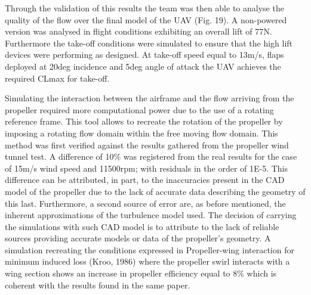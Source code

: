 \documentclass[../../main.tex]{subfiles}
\begin{document}

Through the validation of this results the team was then able to analyse the quality of the flow over the final model of the UAV (Fig. 19).
A non-powered version was analysed in flight conditions exhibiting an overall lift of 77N.
Furthermore the take-off conditions were simulated to ensure that the high lift devices were performing as designed.
At take-off speed equal to 13m/s, flaps deployed at 20deg incidence and 5deg angle of attack the UAV achieves the required CLmax for take-off. 


Simulating the interaction between the airframe and the flow arriving from the propeller required more computational power due to the use of a rotating reference frame.
This tool allows to recreate the rotation of the propeller by imposing a rotating flow domain within the free moving flow domain.
This method was first verified against the results gathered from the propeller wind tunnel test.
A difference of 10\% was registered from the real results for the case of 15m/s wind speed and 11500rpm; with residuals in the order of 1E-5.
This difference can be attributed, in part, to the inaccuracies present in the CAD model of the propeller due to the lack of accurate data describing the geometry of this last.
Furthermore, a second source of error are, as before mentioned, the inherent approximations of the turbulence model used.
The decision of carrying the simulations with such CAD model is to attribute to the lack of reliable sources providing accurate models or data of the propeller’s geometry.
A simulation recreating the conditions expressed in Propeller-wing interaction for minimum induced loss (Kroo, 1986) where the propeller swirl interacts with a wing section shows an increase in propeller efficiency equal to 8\% which is coherent with the results found in the same paper.

\end{document}
